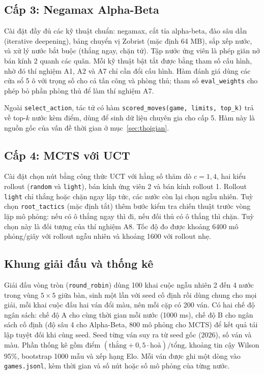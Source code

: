 \documentclass[12pt,a4paper]{report}
\begin{document}
\subsection{Cấp 3: Negamax Alpha-Beta}
Cài đặt đầy đủ các kỹ thuật chuẩn: negamax, cắt tỉa alpha-beta, đào sâu dần (iterative deepening), bảng chuyển vị Zobrist (mặc định 64 MB), sắp xếp nước, và xử lý nước bắt buộc (thắng ngay, chặn tứ). Tập nước ứng viên là phép giãn nở bán kính 2 quanh các quân. Mỗi kỹ thuật bật tắt được bằng tham số cấu hình, nhờ đó thí nghiệm A1, A2 và A7 chỉ cần đổi cấu hình. Hàm đánh giá dùng các cửa sổ 5 ô với trọng số cho cả tấn công và phòng thủ; tham số \texttt{eval\_weights} cho phép bỏ phần phòng thủ để làm thí nghiệm A7.

Ngoài \texttt{select\_action}, tác tử có hàm \texttt{scored\_moves(game, limits, top\_k)} trả về top-$k$ nước kèm điểm, dùng để sinh dữ liệu chuyên gia cho cấp 5. Hàm này là nguồn gốc của vấn đề thời gian ở mục~\ref{sec:thoigian}.

\subsection{Cấp 4: MCTS với UCT}
Cài đặt chọn nút bằng công thức UCT với hằng số thăm dò $c = 1{,}4$, hai kiểu rollout (\texttt{random} và \texttt{light}), bán kính ứng viên 2 và bán kính rollout 1. Rollout \texttt{light} chỉ thắng hoặc chặn ngay lập tức, các nước còn lại chọn ngẫu nhiên. Tuỳ chọn \texttt{root\_tactics} (mặc định tắt) thêm bước kiểm tra chiến thuật trước vòng lặp mô phỏng: nếu có ô thắng ngay thì đi, nếu đối thủ có ô thắng thì chặn. Tuỳ chọn này là đối tượng của thí nghiệm A8. Tốc độ đo được khoảng \num{6400} mô phỏng/giây với rollout ngẫu nhiên và khoảng \num{1600} với rollout nhẹ.

\subsection{Khung giải đấu và thống kê}
Giải đấu vòng tròn (\texttt{round\_robin}) dùng 100 khai cuộc ngẫu nhiên 2 đến 4 nước trong vùng $5\times5$ giữa bàn, sinh một lần với seed cố định rồi dùng chung cho mọi giải, mỗi khai cuộc đấu hai ván đổi màu, nên mỗi cặp có 200 ván. Có hai chế độ ngân sách: chế độ A cho cùng thời gian mỗi nước (1000 ms), chế độ B cho ngân sách cố định (độ sâu 4 cho Alpha-Beta, 800 mô phỏng cho MCTS) để kết quả tái lập tuyệt đối khi cùng seed. Seed từng ván suy ra từ seed gốc ($2026$), số ván và màu. Phần thống kê gồm điểm $(\text{thắng}+0{,}5\cdot\text{hoà})/\text{tổng}$, khoảng tin cậy Wilson 95\%, bootstrap 1000 mẫu và xếp hạng Elo. Mỗi ván được ghi một dòng vào \texttt{games.jsonl}, kèm thời gian và số nút hoặc số mô phỏng của từng nước.
\end{document}
